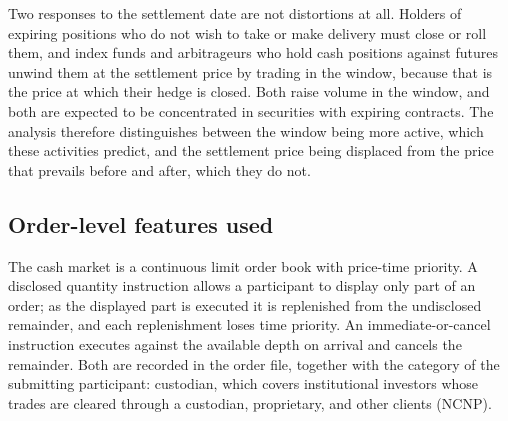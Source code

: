 Two responses to the settlement date are not distortions at all. Holders of expiring
positions who do not wish to take or make delivery must close or roll them, and index funds
and arbitrageurs who hold cash positions against futures unwind them at the settlement price
by trading in the window, because that is the price at which their hedge is closed. Both
raise volume in the window, and both are expected to be concentrated in securities with
expiring contracts. The analysis therefore distinguishes between the window being more
active, which these activities predict, and the settlement price being displaced from the
price that prevails before and after, which they do not.

\subsection{Order-level features used}

The cash market is a continuous limit order book with price-time priority. A disclosed
quantity instruction allows a participant to display only part of an order; as the displayed
part is executed it is replenished from the undisclosed remainder, and each replenishment
loses time priority. An immediate-or-cancel instruction executes against the available
depth on arrival and cancels the remainder. Both are recorded in the order file, together
with the category of the submitting participant: custodian, which covers institutional
investors whose trades are cleared through a custodian, proprietary, and other clients
(NCNP).
